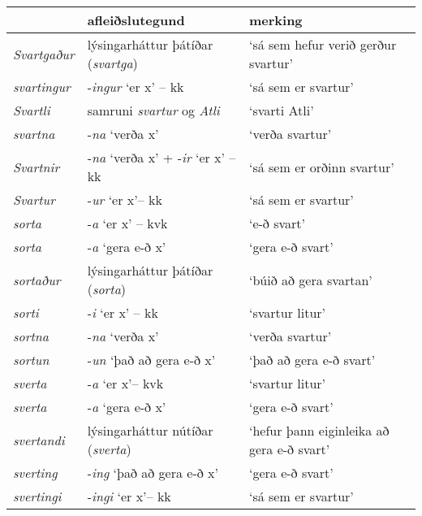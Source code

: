 \documentclass[../samsetningasafn.tex]{subfiles}
\begin{document}
\begin{table}[ht!]%
\begin{footnotesize}
\begin{tcolorbox}
	\begin{center}
	\begin{tabularx}{\textwidth}{Xll}
					&	\textbf{afleiðslutegund}					&	\textbf{merking}	\\
	\hline
	\textit{Svartgaður}		&	lýsingarháttur þátíðar (\textit{svartga})	&	\lq sá sem hefur verið gerður svartur\rq	\\
	\textit{svartingur}		&	-\textit{ingur} \lq er x\rq{} -- kk			&	\lq sá sem er svartur\rq 	\\
	\textit{Svartli}		&	samruni \textit{svartur} og \textit{Atli}	&	\lq svarti Atli\rq		\\
	\textit{svartna}		&	-\textit{na} \lq verða x\rq				&	\lq verða svartur\rq	\\
	\textit{Svartnir}		&	-\textit{na} \lq verða x\rq{} + -\textit{ir} \lq er x\rq{} -- kk	&	\lq sá sem er orðinn svartur\rq	\\
	\textit{Svartur}		&	-\textit{ur} \lq er x\rq -- kk				&	\lq sá sem er svartur\rq	\\
	\textit{sorta}		&	-\textit{a} \lq er x\rq{} -- kvk				&	\lq e-ð svart\rq	\\
	\textit{sorta}		&	-\textit{a} \lq gera e-ð x\rq				&	\lq gera e-ð svart\rq		\\
	\textit{sortaður}		&	lýsingarháttur þátíðar (\textit{sorta})		&	\lq búið að gera svartan\rq	\\
	\textit{sorti}			&	-\textit{i} \lq er x\rq{} -- kk 				&	\lq svartur litur\rq	\\
	\textit{sortna}		&	-\textit{na} \lq verða x\rq				&	\lq verða svartur\rq	\\
	\textit{sortun}		&	-\textit{un} \lq það að gera e-ð x\rq		&	\lq það að gera e-ð svart\rq	\\
	\textit{sverta}		&	-\textit{a} \lq er x\rq -- kvk 				&	\lq svartur litur\rq	\\
	\textit{sverta}		&	-\textit{a} \lq gera e-ð x\rq				&	\lq gera e-ð svart\rq		\\
	\textit{svertandi}	&	lýsingarháttur nútíðar (\textit{sverta})		&	\lq hefur þann eiginleika að gera e-ð svart\rq	\\
	\textit{sverting}		&	-\textit{ing} \lq það að gera e-ð x\rq		&	\lq gera e-ð svart\rq	\\
	\textit{svertingi}		&	-\textit{ingi} \lq er x\rq -- kk				&	\lq sá sem er svartur\rq	\\

\end{tabularx}
\end{center}
\end{tcolorbox}
\end{footnotesize}
\end{table}
\end{document}

